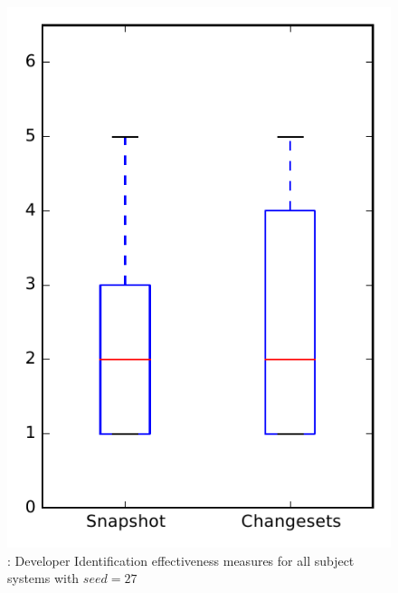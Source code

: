 
\begin{figure}
\centering
\includegraphics[height=0.4\textheight]{figures/dit_seed/rq1_overview_27}
\caption{\rtwo: Developer Identification effectiveness measures for all subject systems with $seed=27$}
\label{fig:dit_seed:rq1:overview}
\end{figure}
